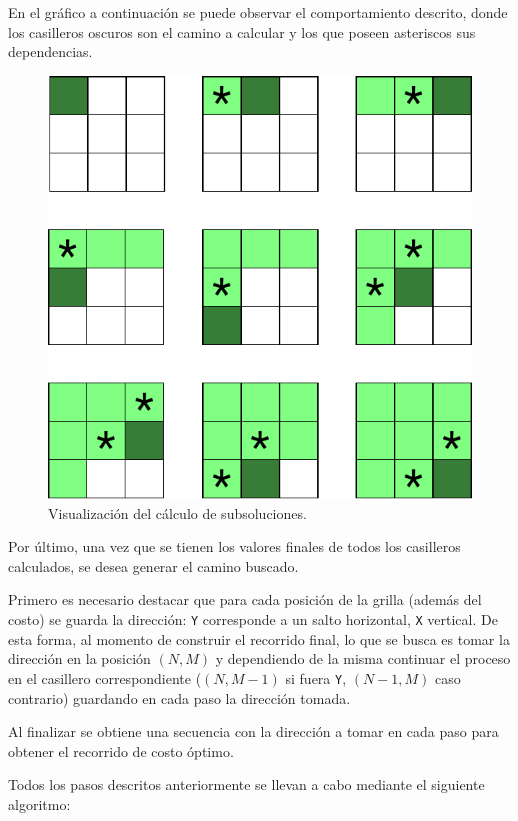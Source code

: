 	En el gráfico a continuación se puede observar el comportamiento descrito,
	donde los casilleros oscuros son el camino a calcular y los que poseen
	asteriscos sus dependencias.

	\begin{figure}[H]
		\centering
		\includegraphics{imagenes/ej3_grilla_2.pdf}
		\caption{Visualización del cálculo de subsoluciones.}
	\end{figure}

	Por último, una vez que se tienen los valores finales de todos los
	casilleros calculados, se desea generar el camino buscado.

	Primero es necesario destacar que para cada posición de la
	grilla (además del costo) se guarda la dirección: \texttt{Y} corresponde a
	un salto horizontal, \texttt{X} vertical. De esta forma, al momento de
	construir el recorrido final, lo que se busca es tomar la dirección en la
	posición $(N, M)$ y dependiendo de la misma continuar el proceso
	en el casillero correspondiente ($(N, M - 1)$ si fuera \texttt{Y}, $(N - 1,
	M)$ caso contrario) guardando en cada paso la dirección tomada.

	Al finalizar se obtiene una secuencia con la dirección a tomar
	en cada paso para obtener el recorrido de costo óptimo.

	Todos los pasos descritos anteriormente se llevan a cabo mediante el siguiente algoritmo:

